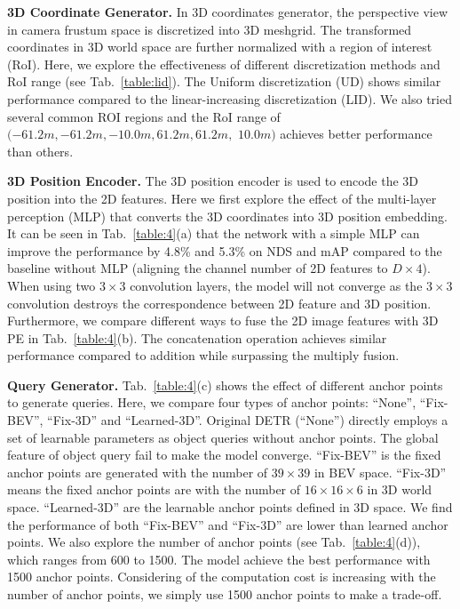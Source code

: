 \documentclass[runningheads]{llncs}
\begin{document}
\noindent \textbf{3D Coordinate Generator.}
In 3D coordinates generator, the perspective view in camera frustum space is discretized into 3D meshgrid. The transformed coordinates in 3D world space are further normalized with a region of interest (RoI). Here, we explore the effectiveness of different discretization methods and RoI range (see Tab.~\ref{table:lid}). The Uniform discretization (UD) shows similar performance compared to the linear-increasing discretization (LID). We also tried several common ROI regions and the RoI range of $(-61.2m, -61.2m, -10.0m, 61.2m, 61.2m,$ $ 10.0m)$ achieves better performance than others.

\noindent \textbf{3D Position Encoder.}
The 3D position encoder is used to encode the 3D position into the 2D features. Here we first explore the effect of the multi-layer perception (MLP) that converts the 3D coordinates into 3D position embedding. It can be seen in Tab.~\ref{table:4}(a) that the network with a simple MLP can improve the performance by 4.8\% and 5.3\% on NDS and mAP compared to the baseline without MLP (aligning the channel number of 2D features to $D\times4$). When using two $3\times3$ convolution layers, the model will not converge as the $3\times3$ convolution destroys the correspondence between 2D feature and 3D position. Furthermore, we compare different ways to fuse the 2D image features with 3D PE in Tab.~\ref{table:4}(b). The concatenation operation achieves similar performance compared to addition while surpassing the multiply fusion.

\noindent \textbf{Query Generator.}
Tab.~\ref{table:4}(c) shows the effect of different anchor points to generate queries. Here, we compare four types of anchor points: ``None'', ``Fix-BEV'', ``Fix-3D'' and ``Learned-3D''. Original DETR (``None'') directly employs a set of learnable parameters as object queries without anchor points. The global feature of object query fail to make the model converge. ``Fix-BEV'' is the fixed anchor points are generated with the number of $39 \times 39$ in BEV space. ``Fix-3D'' means the fixed anchor points are with the number of $16 \times 16 \times 6$ in 3D world space. ``Learned-3D'' are the learnable anchor points defined in 3D space. We find the performance of both ``Fix-BEV'' and ``Fix-3D'' are lower than learned anchor points. We also explore the number of anchor points (see Tab.~\ref{table:4}(d)), which ranges from 600 to 1500. The model achieve the best performance with 1500 anchor points. Considering of the computation cost is increasing with the number of anchor points, we simply use 1500 anchor points to make a trade-off.
\end{document}
